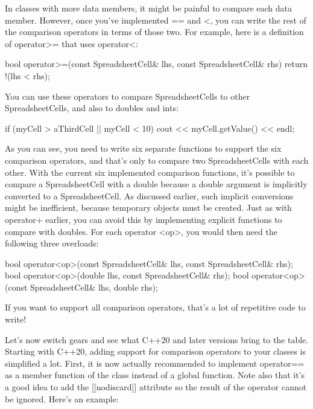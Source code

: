 In classes with more data members, it might be painful to compare each data member. However, once you’ve implemented == and <, you can write the rest of the comparison operators in terms of those two. For example, here is a definition of operator>= that uses operator<:

\begin{cpp}
bool operator>=(const SpreadsheetCell& lhs, const SpreadsheetCell& rhs)
{
    return !(lhs < rhs);
}
\end{cpp}

You can use these operators to compare SpreadsheetCells to other SpreadsheetCells, and also to doubles and ints:

\begin{cpp}
if (myCell > aThirdCell || myCell < 10) {
    cout << myCell.getValue() << endl;
}
\end{cpp}

As you can see, you need to write six separate functions to support the six comparison operators, and that’s only to compare two SpreadsheetCells with each other. With the current six implemented comparison functions, it’s possible to compare a SpreadsheetCell with a double because a double argument is implicitly converted to a SpreadsheetCell. As discussed earlier, such implicit conversions might be inefficient, because temporary objects must be created. Just as with operator+ earlier, you can avoid this by implementing explicit functions to compare with doubles. For each operator <op>, you would then need the following three overloads:

\begin{cpp}
bool operator<op>(const SpreadsheetCell& lhs, const SpreadsheetCell& rhs);
bool operator<op>(double lhs, const SpreadsheetCell& rhs);
bool operator<op>(const SpreadsheetCell& lhs, double rhs);
\end{cpp}

If you want to support all comparison operators, that’s a lot of repetitive code to write!


Let’s now switch gears and see what C++20 and later versions bring to the table. Starting with C++20, adding support for comparison operators to your classes is simplified a lot. First, it is now actually recommended to implement operator== as a member function of the class instead of a global function. Note also that it’s a good idea to add the [[nodiscard]] attribute so the result of the operator cannot be ignored. Here’s an example:

